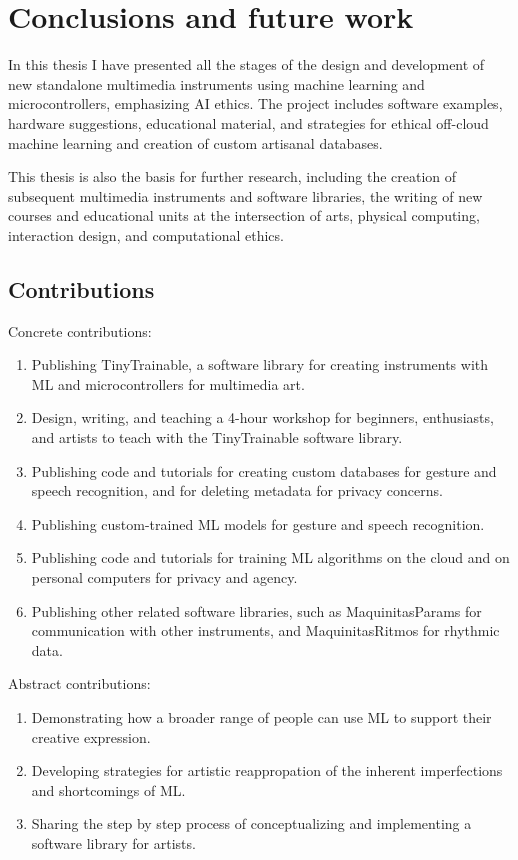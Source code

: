 \chapter{Conclusions and future work}

In this thesis I have presented all the stages of the design and development of new standalone multimedia instruments using machine learning and microcontrollers, emphasizing \acrshort{AI} ethics. The project includes software examples, hardware suggestions, educational material, and strategies for ethical off-cloud machine learning and creation of custom artisanal databases.

This thesis is also the basis for further research, including the creation of subsequent multimedia instruments and software libraries, the writing of new courses and educational units at the intersection of arts, physical computing, interaction design, and computational ethics.

\section{Contributions}

Concrete contributions:

\begin{enumerate}
  \item Publishing TinyTrainable, a software library for creating instruments with  \acrshort{ML} and microcontrollers for multimedia art.
  \item Design, writing, and teaching a 4-hour workshop for beginners, enthusiasts, and artists to teach with the TinyTrainable software library.
  \item Publishing code and tutorials for creating custom databases for gesture and speech recognition, and for deleting metadata for privacy concerns.
  \item Publishing custom-trained \acrshort{ML} models for gesture and speech recognition.
  \item Publishing code and tutorials for training \acrshort{ML} algorithms on the cloud and on personal computers for privacy and agency.
  \item Publishing other related software libraries, such as MaquinitasParams for communication with other instruments, and MaquinitasRitmos for rhythmic data.
\end{enumerate}

Abstract contributions:

\begin{enumerate}
 \item Demonstrating how a broader range of people can use \acrshort{ML} to support their creative expression.
 \item Developing strategies for artistic reappropation of the inherent imperfections and shortcomings of \acrshort{ML}.
 \item Sharing the step by step process of conceptualizing and implementing a software library for artists.
\end{enumerate}

